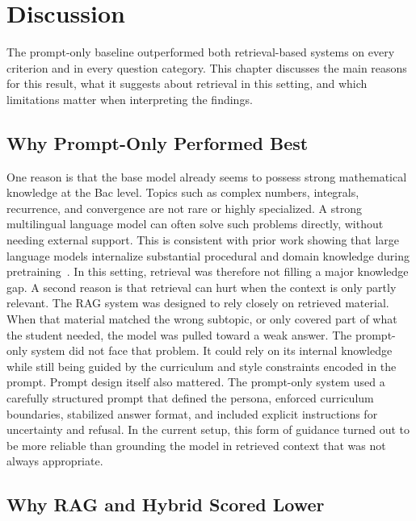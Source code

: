 \chapter{Discussion}
\label{chap:discussion}

The prompt-only baseline outperformed both retrieval-based systems on every
criterion and in every question category. This chapter discusses the main
reasons for this result, what it suggests about retrieval in this setting,
and which limitations matter when interpreting the findings.

\section{Why Prompt-Only Performed Best}
\label{sec:interpretation}

One reason is that the base model already seems to possess strong
mathematical knowledge at the Bac level. Topics such as complex numbers,
integrals, recurrence, and convergence are not rare or highly specialized.
A strong multilingual language model can often solve such problems directly,
without needing external support. This is consistent with prior work showing
that large language models internalize substantial procedural and domain
knowledge during pretraining~\cite{brown2020gpt3}. In this setting,
retrieval was therefore not filling a major knowledge gap.
A second reason is that retrieval can hurt when the context is only partly
relevant. The RAG system was designed to rely closely on retrieved material.
When that material matched the wrong subtopic, or only covered part of what
the student needed, the model was pulled toward a weak answer. The
prompt-only system did not face that problem. It could rely on its internal
knowledge while still being guided by the curriculum and style constraints
encoded in the prompt.
Prompt design itself also mattered. The prompt-only system used a carefully
structured prompt that defined the persona, enforced curriculum boundaries,
stabilized answer format, and included explicit instructions for uncertainty
and refusal. In the current setup, this form of guidance turned out to be
more reliable than grounding the model in retrieved context that was not
always appropriate.

\section{Why RAG and Hybrid Scored Lower}
\label{sec:rag-hybrid-discussion}

